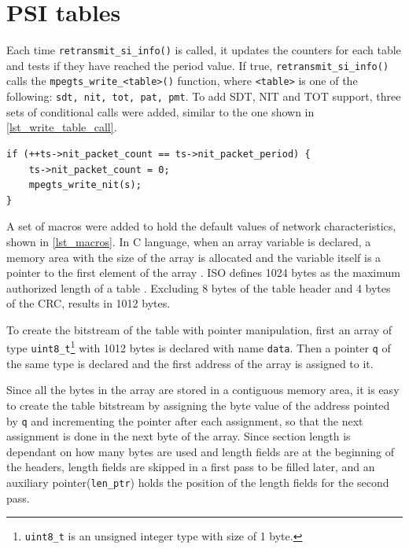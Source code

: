 \documentclass[
	12pt,				%
	openright,			%
	twoside,			%
	a4paper,			%
	brazil,
	french,				%
	english
	]{abntex2}
\begin{document}
\section{PSI tables}

Each time \texttt{retransmit\_si\_info()} is called, it updates the counters for each table and tests if they have reached the period value. If true, \texttt{retransmit\_si\_info()} calls the \texttt{mpegts\_write\_<table>()} function, where \texttt{<table>} is one of the following: \texttt{sdt, nit, tot, pat, pmt}. To add SDT, NIT and TOT support, three sets of conditional calls were added, similar to the one shown in \autoref{lst_write_table_call}.

\begin{lstlisting}[caption={Conditional call to \texttt{mpegts\_write\_nit()}.}, label={lst_write_table_call}]
if (++ts->nit_packet_count == ts->nit_packet_period) {
    ts->nit_packet_count = 0;
    mpegts_write_nit(s);
}
\end{lstlisting}

A set of macros were added to hold the default values of network characteristics, shown in \autoref{lst_macros}. In C language, when an array variable is declared, a memory area with the size of the array is allocated and the variable itself is a pointer to the first element of the array . ISO defines 1024 bytes as the maximum authorized length of a table . Excluding 8 bytes of the table header and 4 bytes of the CRC, results in 1012 bytes.

To create the bitstream of the table with pointer manipulation, first an array of type \texttt{uint8\_t}\footnote{\texttt{uint8\_t} is an unsigned integer type with size of 1 byte.} with 1012 bytes is declared with name \texttt{data}. Then a pointer \texttt{q} of the same type is declared and the first address of the array is assigned to it.

Since all the bytes in the array are stored in a contiguous memory area, it is easy to create the table bitstream by assigning the byte value of the address pointed by \texttt{q} and incrementing the pointer after each assignment, so that the next assignment is done in the next byte of the array. Since section length is dependant on how many bytes are used and length fields are at the beginning of the headers, length fields are skipped in a first pass to be filled later, and an auxiliary pointer(\texttt{len\_ptr}) holds the position of the length fields for the second pass. 
\end{document}
